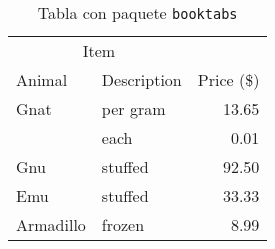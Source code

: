\documentclass[11pt,a4paper]{article}
\begin{document}
\begin{table}[hbt]
   \centering
   	  \caption{Tabla con paquete \texttt{booktabs}}
   	  \label{tab:booktabs}      
   	  \begin{tabular}{llr}
      \toprule
      \multicolumn{2}{c}{Item} \\
      \cmidrule(r){1-2}
      Animal & Description & Price (\$) \\
      \midrule
      Gnat  & per gram & 13.65 \\
            & each     &  0.01 \\
      Gnu   & stuffed  & 92.50 \\
      Emu   & stuffed  & 33.33 \\
      Armadillo & frozen & 8.99 \\
      \bottomrule
      \end{tabular}
\end{table}
\end{document}
